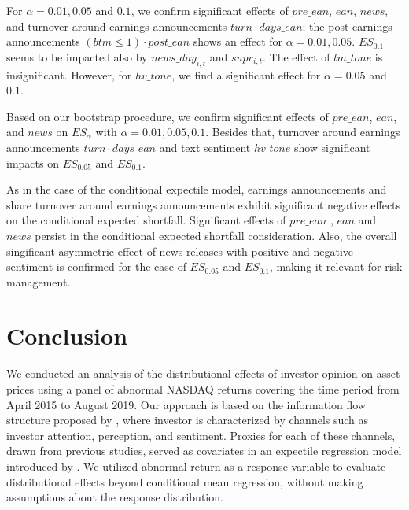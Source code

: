 \documentclass[11pt]{article}
\begin{document}
For \(\alpha = 0.01,0.05\) and \(0.1\), we confirm significant effects of \(pre\_ean\),  \(ean\), \(news\), and turnover around earnings announcements \(turn\cdot days\_ean\); the post earnings announcements  \((btm\leq 1)\cdot post\_ean\) shows an effect for \(\alpha=0.01, 0.05\). $ES_{0.1}$ seems to be impacted also by $news\_day_{i,t}$ and $supr_{i,t}$. The effect of \(lm\_tone\) is  insignificant. However, for \(hv\_tone\), we find a significant effect for \(\alpha=0.05\) and \(0.1\).


Based on our bootstrap procedure, we confirm significant effects of \(pre\_ean\), \(ean\), and \(news\) on \(ES_\alpha\) with \(\alpha=0.01,0.05,0.1\). Besides that, turnover around earnings announcements \(turn\cdot days\_ean\) and text sentiment \(hv\_tone\) show significant impacts on \(ES_{0.05}\) and \(ES_{0.1}\).

As in the case of the conditional expectile model, earnings announcements and share turnover around earnings announcements exhibit significant negative effects on the conditional expected shortfall. Significant effects of \(pre\_ean\) , \(ean\) and $news$ persist in the conditional expected shortfall consideration. Also, the overall singificant asymmetric effect of news releases with positive and negative sentiment is confirmed for the case of $ES_{0.05}$ and  $ES_{0.1}$,  making it relevant for risk management.

\hypertarget{conclusion}{%
\section{Conclusion}\label{conclusion}}

We conducted an analysis of the distributional effects of  investor opinion on asset prices using a panel of abnormal NASDAQ returns covering the time period from April 2015 to August 2019. Our approach is based on the information flow structure proposed  by \cite{Su2021}, where investor is characterized by channels such as investor attention, perception, and sentiment. Proxies for each of these channels, drawn from previous studies, served as covariates in an expectile regression model introduced  by \cite{Newey1987}. We utilized abnormal return as a response variable to evaluate distributional effects beyond conditional mean regression, without making assumptions about the response distribution.
\end{document}
